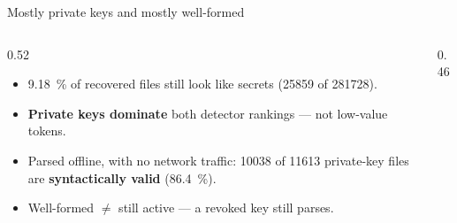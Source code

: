 \documentclass[aspectratio=169]{beamer}
\newcommand{\SecretResolvedBlobs}{\num{281728}\xspace}
\newcommand{\SecretFindingBlobs}{\num{25859}\xspace}
\newcommand{\SecretDetectionRate}{\SI{9.18}{\percent}\xspace}
\newcommand{\SecretPKValidBlobs}{\num{10038}\xspace}
\newcommand{\SecretPKFlaggedBlobs}{\num{11613}\xspace}
\newcommand{\SecretPKValidPct}{\SI{86.4}{\percent}\xspace}
\begin{document}
\begin{frame}{Mostly private keys and mostly well-formed}
    \begin{columns}[T,totalwidth=\textwidth]
        \begin{column}{0.52\textwidth}
            \small
            \begin{itemize}\setlength{\itemsep}{0.5em}
                \item \SecretDetectionRate{} of recovered files still look like secrets
                      (\SecretFindingBlobs{} of \SecretResolvedBlobs).
                \item \textbf{Private keys dominate} both detector rankings --- not
                      low-value tokens.
                \item Parsed offline, with no network traffic: \SecretPKValidBlobs{} of
                      \SecretPKFlaggedBlobs{} private-key files are
                      \textbf{syntactically valid} (\SecretPKValidPct).
                \item Well-formed $\neq$ still active --- a revoked key still parses.
            \end{itemize}
        \end{column}
        \begin{column}{0.46\textwidth}
            \centering
        \end{column}
    \end{columns}
\end{frame}
\end{document}

